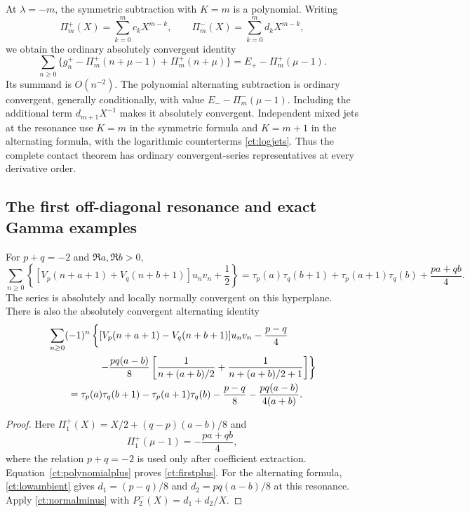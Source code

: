 At $\lambda=-m$, the symmetric subtraction with $K=m$ is a polynomial.
Writing
\begin{equation}\label{ct:resonantP}
 \Pi_m^+(X)=\sum_{k=0}^mc_kX^{m-k},\qquad
 \Pi_m^-(X)=\sum_{k=0}^md_kX^{m-k},
\end{equation}
we obtain the ordinary absolutely convergent identity
\begin{equation}\label{ct:polynomialplus}
 \sum_{n\ge0}\{g_n^+-\Pi_m^+(n+\mu-1)+\Pi_m^+(n+\mu)\}
              =E_+-\Pi_m^+(\mu-1).
\end{equation}
Its summand is $O(n^{-2})$. The polynomial alternating subtraction is
ordinary convergent, generally conditionally, with value
$E_--\Pi_m^-(\mu-1)$. Including the additional term
$d_{m+1}X^{-1}$ makes it absolutely convergent. Independent mixed jets
at the resonance use $K=m$ in the symmetric formula and $K=m+1$ in
the alternating formula, with the logarithmic counterterms
\eqref{ct:logjets}. Thus the complete contact theorem has ordinary
convergent-series representatives at every derivative order.

\subsection{The first off-diagonal resonance and exact Gamma examples}

\begin{corollary}[A short identity on $p+q=-2$]\label{ct:firstresonance}
For $p+q=-2$ and $\Re a,\Re b>0$,
\begin{equation}\label{ct:firstplus}
 \boxed{\displaystyle
 \sum_{n\ge0}\left\{
  [V_p(n+a+1)+V_q(n+b+1)]u_nv_n+\frac12\right\}
 =\tau_p(a)\tau_q(b+1)+\tau_p(a+1)\tau_q(b)+\frac{pa+qb}{4}.}
\end{equation}
The series is absolutely and locally normally convergent on this
hyperplane. There is also the absolutely convergent alternating identity
\begin{align}
 &\sum_{n\ge0}(-1)^n\left\{
 [V_p(n+a+1)-V_q(n+b+1)]u_nv_n-\frac{p-q}{4}\right.\notag\\
 &\hspace{18mm}\left.
 -\frac{pq(a-b)}8\left[\frac1{n+(a+b)/2}
                      +\frac1{n+(a+b)/2+1}\right]\right\}\notag\\
 &\qquad=\tau_p(a)\tau_q(b+1)-\tau_p(a+1)\tau_q(b)
            -\frac{p-q}{8}-\frac{pq(a-b)}{4(a+b)}.
                                                    \label{ct:firstminus}
\end{align}
\end{corollary}
\begin{proof}
Here $\Pi_1^+(X)=X/2+(q-p)(a-b)/8$ and
\[
 \Pi_1^+(\mu-1)=-\frac{pa+qb}{4},
\]
where the relation $p+q=-2$ is used only after coefficient extraction.
Equation~\eqref{ct:polynomialplus} proves \eqref{ct:firstplus}.
For the alternating formula, \eqref{ct:lowambient} gives
$d_1=(p-q)/8$ and $d_2=pq(a-b)/8$ at this resonance. Apply
\eqref{ct:normalminus} with $P_2^-(X)=d_1+d_2/X$.
\end{proof}

